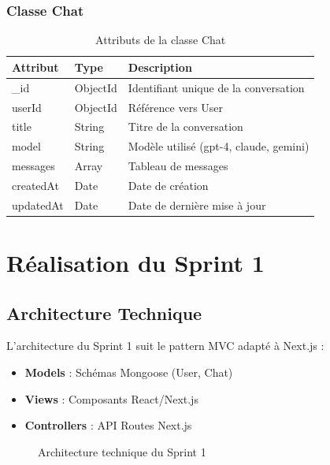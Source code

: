 \subsubsection{Classe Chat}

\begin{table}[H]
\centering
\caption{Attributs de la classe Chat}
\label{tab:class-chat}
\begin{tabular}{|l|l|p{6cm}|}
\hline
\textbf{Attribut} & \textbf{Type} & \textbf{Description} \\
\hline
\_id & ObjectId & Identifiant unique de la conversation \\
\hline
userId & ObjectId & Référence vers User \\
\hline
title & String & Titre de la conversation \\
\hline
model & String & Modèle utilisé (gpt-4, claude, gemini) \\
\hline
messages & Array & Tableau de messages \\
\hline
createdAt & Date & Date de création \\
\hline
updatedAt & Date & Date de dernière mise à jour \\
\hline
\end{tabular}
\end{table}

\section{Réalisation du Sprint 1}

\subsection{Architecture Technique}

L'architecture du Sprint 1 suit le pattern MVC adapté à Next.js :

\begin{itemize}
    \item \textbf{Models} : Schémas Mongoose (User, Chat)
    \item \textbf{Views} : Composants React/Next.js
    \item \textbf{Controllers} : API Routes Next.js
\end{itemize}

\begin{figure}[H]
    \centering
    \caption{Architecture technique du Sprint 1}
    \label{fig:archi-sprint1}
\end{figure}

